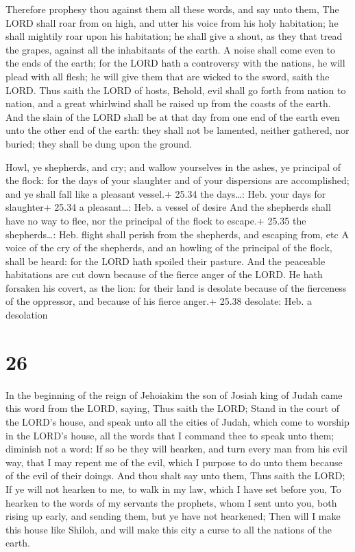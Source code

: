  Therefore prophesy thou against them all these words, and
say unto them, The LORD shall roar from on high, and utter his voice
from his holy habitation; he shall mightily roar upon his habitation; he
shall give a shout, as they that tread the grapes, against all the
inhabitants of the earth.  A noise shall come even to the
ends of the earth; for the LORD hath a controversy with the nations, he
will plead with all flesh; he will give them that are wicked to the
sword, saith the LORD.  Thus saith the LORD of hosts,
Behold, evil shall go forth from nation to nation, and a great whirlwind
shall be raised up from the coasts of the earth.  And the
slain of the LORD shall be at that day from one end of the earth even
unto the other end of the earth: they shall not be lamented, neither
gathered, nor buried; they shall be dung upon the ground.

 Howl, ye shepherds, and cry; and wallow yourselves in
the ashes, ye principal of the flock: for the days of your slaughter and
of your dispersions are accomplished; and ye shall fall like a pleasant
vessel.+ 25.34 the days\ldots: Heb. your days for slaughter+ 25.34 a
pleasant\ldots: Heb. a vessel of desire  And the shepherds
shall have no way to flee, nor the principal of the flock to escape.+
25.35 the shepherds\ldots: Heb. flight shall perish from the shepherds,
and escaping from, etc  A voice of the cry of the
shepherds, and an howling of the principal of the flock, shall be heard:
for the LORD hath spoiled their pasture.  And the peaceable
habitations are cut down because of the fierce anger of the LORD.
 He hath forsaken his covert, as the lion: for their land
is desolate because of the fierceness of the oppressor, and because of
his fierce anger.+ 25.38 desolate: Heb. a desolation

\hypertarget{section-25}{%
\section{26}\label{section-25}}

 In the beginning of the reign of Jehoiakim the son of
Josiah king of Judah came this word from the LORD, saying, 
Thus saith the LORD; Stand in the court of the LORD's house, and speak
unto all the cities of Judah, which come to worship in the LORD's house,
all the words that I command thee to speak unto them; diminish not a
word:  If so be they will hearken, and turn every man from
his evil way, that I may repent me of the evil, which I purpose to do
unto them because of the evil of their doings.  And thou
shalt say unto them, Thus saith the LORD; If ye will not hearken to me,
to walk in my law, which I have set before you,  To hearken
to the words of my servants the prophets, whom I sent unto you, both
rising up early, and sending them, but ye have not hearkened;
 Then will I make this house like Shiloh, and will make this
city a curse to all the nations of the earth.


